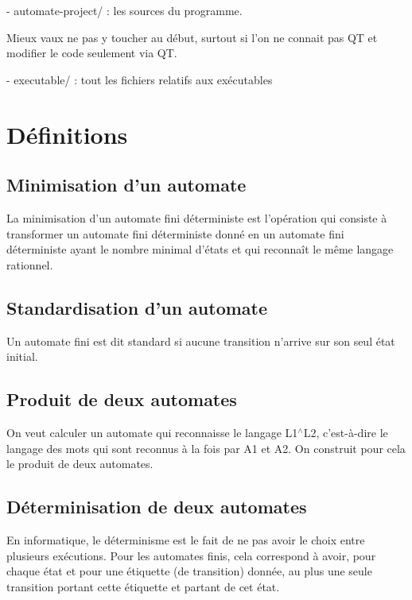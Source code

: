 \begin{DoxyVerb}   - automate-project/ : les sources du programme.
\end{DoxyVerb}
 Mieux vaux ne pas y toucher au début, surtout si l'on ne connait pas Q\-T et modifier le code seulement via Q\-T. \begin{DoxyVerb}  - executable/ : tout les fichiers relatifs aux exécutables
\end{DoxyVerb}
\hypertarget{index_definitions}{}\section{Définitions}\label{index_definitions}
\hypertarget{index_minimisation}{}\subsection{Minimisation d'un automate}\label{index_minimisation}
La minimisation d'un automate fini déterministe est l'opération qui consiste à transformer un automate fini déterministe donné en un automate fini déterministe ayant le nombre minimal d'états et qui reconnaît le même langage rationnel.\hypertarget{index_standardisation}{}\subsection{Standardisation d'un automate}\label{index_standardisation}
Un automate fini est dit standard si aucune transition n'arrive sur son seul état initial.\hypertarget{index_produit}{}\subsection{Produit de deux automates}\label{index_produit}
On veut calculer un automate qui reconnaisse le langage L1$^\wedge$\-L2, c'est-\/à-\/dire le langage des mots qui sont reconnus à la fois par A1 et A2. On construit pour cela le produit de deux automates.\hypertarget{index_determinisation}{}\subsection{Déterminisation de deux automates}\label{index_determinisation}
En informatique, le déterminisme est le fait de ne pas avoir le choix entre plusieurs exécutions. Pour les automates finis, cela correspond à avoir, pour chaque état et pour une étiquette (de transition) donnée, au plus une seule transition portant cette étiquette et partant de cet état. 